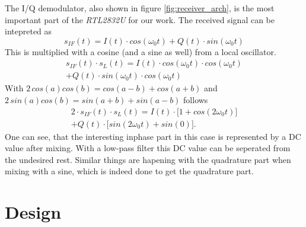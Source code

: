 \documentclass[conference]{IEEEtran}
\begin{document}
The I/Q demodulator, also shown in figure \ref{fig:receiver_arch}, is the most important part of the \textit{RTL2832U} for our work. The received signal can be intepreted as
\begin{equation}
	s_{IF}(t)=I(t) \cdot cos(\omega_{0}t) + Q(t) \cdot sin(\omega_{0}t)
\end{equation}     
This is multiplied with a cosine (and a sine as well) from a local oscillator.
\begin{multline}
        s_{IF}(t) \cdot s_L(t) = I(t) \cdot cos(\omega_{0}t) \cdot cos(\omega_{0}t)\\+ Q(t) \cdot sin(\omega_{0}t) \cdot cos(\omega_{0}t)
\end{multline}
With \ensuremath{2\,cos(a)cos(b)=cos(a-b)+cos(a+b)} and \ensuremath{2\,sin(a)cos(b)=sin(a+b)+sin(a-b)} follows
\begin{multline}
        2 \cdot s_{IF}(t) \cdot s_L(t) = I(t) \cdot \bigl[1+cos(2\omega_{0}t)\bigr]\\+ Q(t) \cdot \bigl[sin(2\omega_0t)+sin(0)\bigr].
\end{multline}
One can see, that the interesting inphase part in this case is represented by a DC value after mixing. With a low-pass filter this DC value can be seperated from the undesired rest. Similar things are hapening with the quadrature part when mixing with a sine, which is indeed done to get the quadrature part.  
\section{Design}
\end{document}

